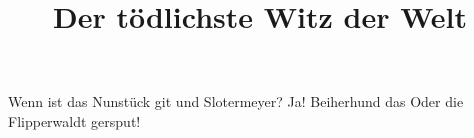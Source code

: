 \documentclass[a4paper]{article}
\title{Der tödlichste Witz der Welt}
\begin{document}
\maketitle

Wenn ist das Nunstück git und Slotermeyer? Ja! Beiherhund das Oder die
Flipperwaldt gersput!
\end{document}
